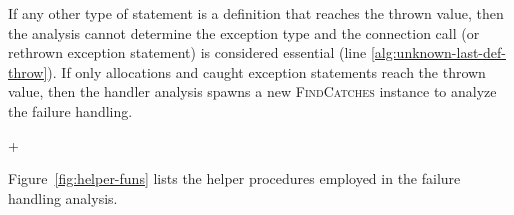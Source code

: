 If any other type of statement is a definition that reaches the thrown
value, then the analysis cannot determine the exception type and the
connection call (or rethrown exception statement) is considered
essential (line \ref{alg:unknown-last-def-throw}).  If only
allocations and caught exception statements reach the thrown value,
then the handler analysis spawns a new \textsc{FindCatches} instance
to analyze the failure handling. 












\lstDeleteShortInline+


Figure~\ref{fig:helper-funs} lists the helper procedures employed in
the failure handling analysis.

